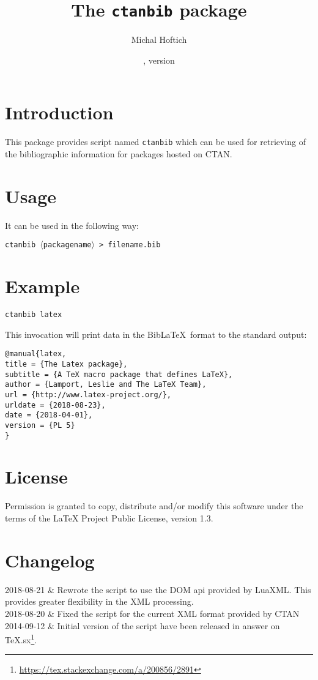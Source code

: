 \documentclass{ltxdoc}
\title{The \texttt{ctanbib} package}
\author{Michal Hoftich}
\date{\gitdate, version \gitversion}
\makeatletter
\newcommand\package[1]{\texttt{#1}}
\newenvironment{changelog}{\longtable{@{} l p{30em}}}{\endlongtable}
\newcommand\change[2]{#1 & #2\\}
\makeatother
\begin{document}
\maketitle

\section{Introduction}
This package provides script named \package{ctanbib} which can be used for retrieving of the bibliographic information for packages hosted on CTAN.

\section{Usage}


It can be used in the following way:


\noindent\package{ctanbib $\langle$packagename$\rangle$ > filename.bib}

\section{Example}

\begin{verbatim}
ctanbib latex  
\end{verbatim}

\noindent This invocation will print data in the Bib\LaTeX\ format to the standard output:

\begin{verbatim}
@manual{latex,
title = {The Latex package},
subtitle = {A TeX macro package that defines LaTeX},
author = {Lamport, Leslie and The LaTeX Team},
url = {http://www.latex-project.org/},
urldate = {2018-08-23}, 
date = {2018-04-01},
version = {PL 5}
}
\end{verbatim}

\section{License}

Permission is granted to copy, distribute and/or modify this software
under the terms of the LaTeX Project Public License, version 1.3.

\section{Changelog}

\begin{changelog}
  \change{2018-08-21}{Rewrote the script to use the DOM api provided by LuaXML. This provides greater flexibility in the XML processing.}
  \change{2018-08-20}{Fixed the script for the current XML format provided by CTAN}
  \change{2014-09-12}{Initial version of the script have been released in answer on TeX.sx\footnote{\url{https://tex.stackexchange.com/a/200856/2891}}.}
\end{changelog}
\end{document}
